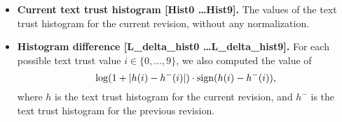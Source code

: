 \begin{itemize}
\item \textbf{Current text trust histogram [Hist0 \ldots Hist9].}
The values of the text trust histogram for the current revision,
without any normalization.

\item \textbf{Histogram difference [L\_delta\_hist0 \ldots L\_delta\_hist9].}
For each possible text trust value $i \in \{0, \ldots, 9\}$, we also
computed the value of
\begin{equation}
\log(1 + |h(i) - h^{-}(i)|) \cdot {{\textrm{sign}}}(h(i) -
h^{-}(i)),
\end{equation}
where $h$ is the text trust histogram for the current
revision, and $h^{-}$ is the text trust histogram for the previous
revision.

\end{itemize}
%

